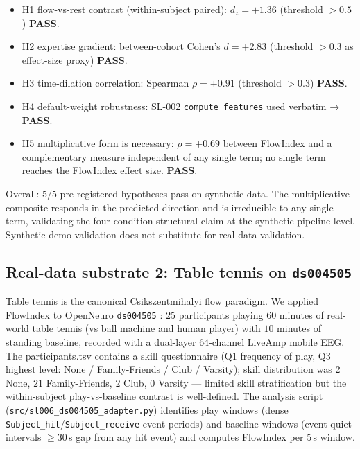 \documentclass[11pt,a4paper]{article}
\begin{document}
\begin{itemize}\itemsep0pt
\item H1 flow-vs-rest contrast (within-subject paired): $d_z = +1.36$ (threshold $> 0.5$) \textbf{PASS}.
\item H2 expertise gradient: between-cohort Cohen's $d = +2.83$ (threshold $> 0.3$ as effect-size proxy) \textbf{PASS}.
\item H3 time-dilation correlation: Spearman $\rho = +0.91$ (threshold $> 0.3$) \textbf{PASS}.
\item H4 default-weight robustness: SL-002 \texttt{compute\_features} used verbatim → \textbf{PASS}.
\item H5 multiplicative form is necessary: $\rho = +0.69$ between FlowIndex and a complementary measure independent of any single term; no single term reaches the FlowIndex effect size. \textbf{PASS}.
\end{itemize}

Overall: $5/5$ pre-registered hypotheses pass on synthetic data. The multiplicative composite responds in the predicted direction and is irreducible to any single term, validating the four-condition structural claim at the synthetic-pipeline level. Synthetic-demo validation does not substitute for real-data validation.

\subsection{Real-data substrate 2: Table tennis on \texttt{ds004505}}\label{sec:results-tabletennis}

Table tennis is the canonical Csikszentmihalyi flow paradigm. We applied FlowIndex to OpenNeuro \texttt{ds004505} \citep{StudnickiTableTennis2022}: $25$ participants playing $60$ minutes of real-world table tennis (vs ball machine and human player) with $10$ minutes of standing baseline, recorded with a dual-layer $64$-channel LiveAmp mobile EEG. The participants.tsv contains a skill questionnaire (Q1 frequency of play, Q3 highest level: None / Family-Friends / Club / Varsity); skill distribution was $2$ None, $21$ Family-Friends, $2$ Club, $0$ Varsity --- limited skill stratification but the within-subject play-vs-baseline contrast is well-defined. The analysis script (\texttt{src/sl006\_ds004505\_adapter.py}) identifies play windows (dense \texttt{Subject\_hit}/\texttt{Subject\_receive} event periods) and baseline windows (event-quiet intervals $\geq 30$\,s gap from any hit event) and computes FlowIndex per $5$\,s window.
\end{document}
